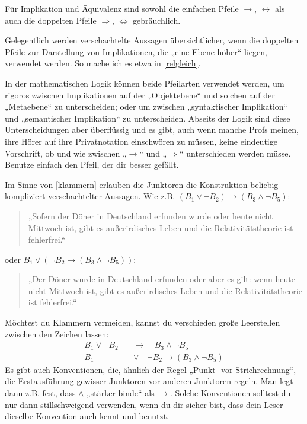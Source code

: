 	
\begin{bem}
    Für Implikation und Äquivalenz sind sowohl die einfachen Pfeile $\to$, $\leftrightarrow$ als auch die doppelten Pfeile $\Rightarrow$, $\Leftrightarrow$ gebräuchlich.
    
    Gelegentlich werden verschachtelte Aussagen übersichtlicher, wenn die doppelten Pfeile zur Darstellung von Implikationen, die „eine Ebene höher“ liegen, verwendet werden. So mache ich es etwa in \cref{relgleich}.
    
    In der mathematischen Logik können beide Pfeilarten verwendet werden, um rigoros zwischen Implikationen auf der „Objektebene“ und solchen auf der „Metaebene“ zu unterscheiden; oder um zwischen „syntaktischer Implikation“ und „semantischer Implikation“ zu unterscheiden. Abseits der Logik sind diese Unterscheidungen aber überflüssig und es gibt, auch wenn manche Profs meinen, ihre Hörer auf ihre Privatnotation einschwören zu müssen, keine eindeutige Vorschrift, ob und wie zwischen „$\to$“ und „$\Rightarrow$“ unterschieden werden müsse. Benutze einfach den Pfeil, der dir besser gefällt.
\end{bem}

	
\begin{bem}
    Im Sinne von \cref{klammern} erlauben die Junktoren die Konstruktion beliebig kompliziert verschachtelter Aussagen. Wie z.B. $(B_1\lor \neg B_2) \to (B_3\land \neg B_5)$:
    \begin{quote}
        „Sofern der Döner in Deutschland erfunden wurde oder heute nicht Mittwoch ist, gibt es außerirdisches Leben und die Relativitätstheorie ist fehlerfrei.“
    \end{quote}
    oder $B_1\lor (\neg B_2 \to (B_3\land \neg B_5))$:
    \begin{quote}
        „Der Döner wurde in Deutschland erfunden oder aber es gilt: wenn heute nicht Mittwoch ist, gibt es außerirdisches Leben und die Relativitätstheorie ist fehlerfrei.“
    \end{quote}
    Möchtest du Klammern vermeiden, kannst du verschieden große Leerstellen zwischen den Zeichen lassen:
    \begin{align*}
        B_1\lor \neg B_2\quad &\to \quad B_3\land \neg B_5 \\[0.5em]
        B_1\quad  &\lor \quad \neg B_2 \to (B_3\land \neg B_5)
    \end{align*}
    Es gibt auch Konventionen, die, ähnlich der Regel „Punkt- vor Strichrechnung“, die Erstausführung gewisser Junktoren vor anderen Junktoren regeln. Man legt dann z.B. fest, dass $\land$ „stärker binde“ als $\to$. Solche Konventionen solltest du nur dann stillschweigend verwenden, wenn du dir sicher bist, dass dein Leser dieselbe Konvention auch kennt und benutzt.
\end{bem}

